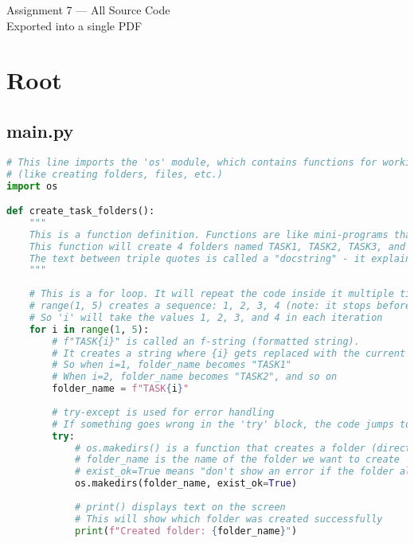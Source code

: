 \documentclass[11pt,a4paper]{article}
\begin{document}
\begin{center}
  {\LARGE Assignment 7 — All Source Code}\\[4pt]
  {\small Exported into a single PDF}
\end{center}
\bigskip

\section*{Root}

\subsection*{main.py}
\begin{lstlisting}[style=codestyle,language=Python]
# This line imports the 'os' module, which contains functions for working with the operating system
# (like creating folders, files, etc.)
import os

def create_task_folders():
    """
    This is a function definition. Functions are like mini-programs that do a specific task.
    This function will create 4 folders named TASK1, TASK2, TASK3, and TASK4.
    The text between triple quotes is called a "docstring" - it explains what the function does.
    """
    
    # This is a for loop. It will repeat the code inside it multiple times.
    # range(1, 5) creates a sequence: 1, 2, 3, 4 (note: it stops before 5)
    # So 'i' will take the values 1, 2, 3, and 4 in each iteration
    for i in range(1, 5):
        # f"TASK{i}" is called an f-string (formatted string). 
        # It creates a string where {i} gets replaced with the current value of i
        # So when i=1, folder_name becomes "TASK1"
        # When i=2, folder_name becomes "TASK2", and so on
        folder_name = f"TASK{i}"
        
        # try-except is used for error handling
        # If something goes wrong in the 'try' block, the code jumps to 'except'
        try:
            # os.makedirs() is a function that creates a folder (directory)
            # folder_name is the name of the folder we want to create
            # exist_ok=True means "don't show an error if the folder already exists"
            os.makedirs(folder_name, exist_ok=True)
            
            # print() displays text on the screen
            # This will show which folder was created successfully
            print(f"Created folder: {folder_name}")
            

\end{lstlisting}
\end{document}
